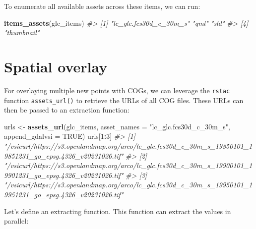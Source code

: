 \documentclass[
  graybox,natbib,nospthms]{svmono}
\newenvironment{Shaded}{\begin{snugshade}}{\end{snugshade}}
\newcommand{\AttributeTok}[1]{\textcolor[rgb]{0.27,0.27,0.27}{#1}}
\newcommand{\CommentTok}[1]{\textcolor[rgb]{0.37,0.37,0.37}{\textit{#1}}}
\newcommand{\ConstantTok}[1]{\textcolor[rgb]{0.37,0.37,0.37}{#1}}
\newcommand{\DecValTok}[1]{\textcolor[rgb]{0.06,0.06,0.06}{#1}}
\newcommand{\FunctionTok}[1]{\textcolor[rgb]{0.27,0.27,0.27}{\textbf{#1}}}
\newcommand{\NormalTok}[1]{#1}
\newcommand{\OtherTok}[1]{\textcolor[rgb]{0.37,0.37,0.37}{#1}}
\newcommand{\SpecialCharTok}[1]{\textcolor[rgb]{0.43,0.43,0.43}{\textbf{#1}}}
\newcommand{\StringTok}[1]{\textcolor[rgb]{0.5,0.5,0.5}{#1}}
\begin{document}
To enumerate all available assets across these items, we can run:

\begin{Shaded}
\begin{Highlighting}[]
\FunctionTok{items\_assets}\NormalTok{(glc\_items)}
\CommentTok{\#\textgreater{} [1] "lc\_glc.fcs30d\_c\_30m\_s" "qml"                   "sld"                  }
\CommentTok{\#\textgreater{} [4] "thumbnail"}
\end{Highlighting}
\end{Shaded}

\hypertarget{spatial-overlay}{%
\section{Spatial overlay}\label{spatial-overlay}}

For overlaying multiple new points with COGs, we can leverage the \texttt{rstac} function \texttt{assets\_url()} to retrieve the URLs of all COG files. These URLs can then be passed to an extraction function:

\begin{Shaded}
\begin{Highlighting}[]
\NormalTok{urls }\OtherTok{\textless{}{-}} \FunctionTok{assets\_url}\NormalTok{(glc\_items, }\AttributeTok{asset\_names =} \StringTok{"lc\_glc.fcs30d\_c\_30m\_s"}\NormalTok{, }\AttributeTok{append\_gdalvsi =} \ConstantTok{TRUE}\NormalTok{)}
\NormalTok{urls[}\DecValTok{1}\SpecialCharTok{:}\DecValTok{3}\NormalTok{]}
\CommentTok{\#\textgreater{} [1] "/vsicurl/https://s3.openlandmap.org/arco/lc\_glc.fcs30d\_c\_30m\_s\_19850101\_19851231\_go\_epsg.4326\_v20231026.tif"}
\CommentTok{\#\textgreater{} [2] "/vsicurl/https://s3.openlandmap.org/arco/lc\_glc.fcs30d\_c\_30m\_s\_19900101\_19901231\_go\_epsg.4326\_v20231026.tif"}
\CommentTok{\#\textgreater{} [3] "/vsicurl/https://s3.openlandmap.org/arco/lc\_glc.fcs30d\_c\_30m\_s\_19950101\_19951231\_go\_epsg.4326\_v20231026.tif"}
\end{Highlighting}
\end{Shaded}

Let's define an extracting function. This function can extract the values in parallel:
\end{document}
